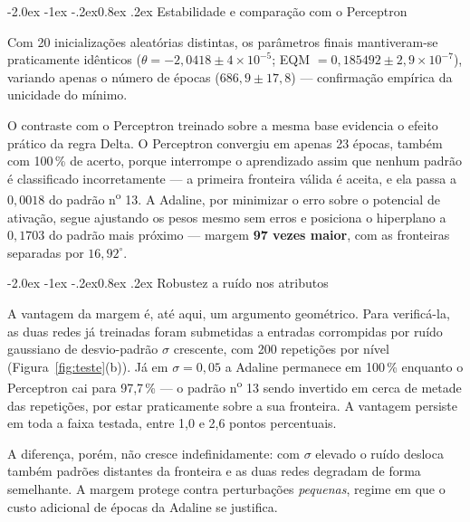 \documentclass[12pt,a4paper]{article}
\makeatletter
\renewcommand\subsection{\@startsection{subsection}{2}{\z@}%
  {-2.0ex \@plus -1ex \@minus -.2ex}{0.8ex \@plus .2ex}%
  {\normalfont\normalsize\bfseries}}
\makeatother
\begin{document}
\subsection{Estabilidade e compara\c{c}\~ao com o Perceptron}

Com 20 inicializa\c{c}\~oes aleat\'orias distintas, os par\^ametros finais
mantiveram-se praticamente id\^enticos ($\theta = -2{,}0418 \pm 4\times10^{-5}$;
EQM $= 0{,}185492 \pm 2{,}9\times10^{-7}$), variando apenas o n\'umero de \'epocas
($686{,}9 \pm 17{,}8$) --- confirma\c{c}\~ao emp\'irica da unicidade do m\'inimo.

O contraste com o Perceptron treinado sobre a mesma base evidencia o efeito
pr\'atico da regra Delta. O Perceptron convergiu em apenas 23 \'epocas, tamb\'em com
100\,\% de acerto, porque interrompe o aprendizado assim que nenhum padr\~ao \'e
classificado incorretamente --- a primeira fronteira v\'alida \'e aceita, e ela
passa a $0{,}0018$ do padr\~ao n\textsuperscript{o} 13. A Adaline, por minimizar o
erro sobre o potencial de ativa\c{c}\~ao, segue ajustando os pesos mesmo sem erros
e posiciona o hiperplano a $0{,}1703$ do padr\~ao mais pr\'oximo --- margem
\textbf{97 vezes maior}, com as fronteiras separadas por $16{,}92^{\circ}$.

\subsection{Robustez a ru\'ido nos atributos}

A vantagem da margem \'e, at\'e aqui, um argumento geom\'etrico. Para verific\'a-la,
as duas redes j\'a treinadas foram submetidas a entradas corrompidas por ru\'ido
gaussiano de desvio-padr\~ao $\sigma$ crescente, com 200 repeti\c{c}\~oes por n\'ivel
(Figura~\ref{fig:teste}(b)). J\'a em $\sigma = 0{,}05$ a Adaline permanece em
100\,\% enquanto o Perceptron cai para 97,7\,\% --- o padr\~ao
n\textsuperscript{o} 13 sendo invertido em cerca de metade das repeti\c{c}\~oes, por
estar praticamente sobre a sua fronteira. A vantagem persiste em toda a faixa
testada, entre 1,0 e 2,6 pontos percentuais.

A diferen\c{c}a, por\'em, n\~ao cresce indefinidamente: com $\sigma$ elevado o
ru\'ido desloca tamb\'em padr\~oes distantes da fronteira e as duas redes degradam
de forma semelhante. A margem protege contra perturba\c{c}\~oes \emph{pequenas},
regime em que o custo adicional de \'epocas da Adaline se justifica.
\end{document}
